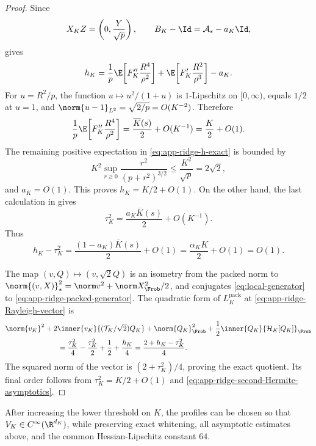 \begin{proof}
Since
\[
  X_KZ=\left(0,\frac{Y}{\sqrt p}\right),\qquad
  B_K-\Id=\mathcal A_s-a_K\Id,
\]
 gives
\begin{equation}
  h_K
  =
  \frac1p\E\!\left[
    F_K''\frac{R^4}{\rho^2}
  \right]
  +
  \E\!\left[
    F_K'\frac{R^2}{\rho^3}
  \right]
  -a_K.
  \label{eq:app-ridge-h-exact}
\end{equation}
For \(u=R^2/p\), the function \(u\mapsto u^2/(1+u)\) is
\(1\)-Lipschitz on \([0,\infty)\), equals \(1/2\) at \(u=1\), and
\(\norm{u-1}_{L^2}=\sqrt{2/p}=O(K^{-2})\).  Therefore
\[
  \frac1p\E\!\left[F_K''\frac{R^4}{\rho^2}\right]
  =
  \frac{\overline K(s)}2+O(K^{-1})
  =
  \frac K2+O(1).
\]
The remaining positive expectation in \eqref{eq:app-ridge-h-exact} is
bounded by
\[
  K^2\sup_{r\geq0}\frac{r^2}{(p+r^2)^{3/2}}
  \leq\frac{K^2}{\sqrt p}=2\sqrt2,
\]
and \(a_K=O(1)\).  This proves \(h_K=K/2+O(1)\).
On the other hand, the last calculation in
 gives
\[
  \tau_K^2
  =
  \frac{a_K\overline K(s)}2+O(K^{-1}).
\]
Thus
\[
  h_K-\tau_K^2
  =
  \frac{(1-a_K)\overline K(s)}2+O(1)
  =
  \frac{\alpha_KK}{2}+O(1)
  =
  O(1).
\]

The map
\((v,Q)\mapsto(v,\sqrt2Q)\) is an isometry from the packed norm to
\(\norm{(v,X)}_\star^2=\norm v^2+\norm X_{\Frob}^2/2\), and conjugates
\eqref{eq:local-generator} to
\eqref{eq:app-ridge-packed-generator}.  The quadratic form of
\(L_K^{\mathrm{pack}}\) at
\eqref{eq:app-ridge-Rayleigh-vector} is
\begin{align*}
  &\norm{v_K}^2
  +2\inner{v_K}{(\mathcal T_K/\sqrt2)Q_K}
  +\norm{Q_K}_{\Frob}^2
  +\frac12\inner{Q_K}{\mathcal H_K[Q_K]}_{\Frob}\\
  &\hspace{25mm}
  =
  \frac{\tau_K^2}{4}-\frac{\tau_K^2}{2}
  +\frac12+\frac{h_K}{4}
  =
  \frac{2+h_K-\tau_K^2}{4}.
\end{align*}
The squared norm of the vector is
\((2+\tau_K^2)/4\), proving the exact quotient.  Its final order follows
from \(\tau_K^2=K/2+O(1)\) and
\eqref{eq:app-ridge-second-Hermite-asymptotics}.
\end{proof}

\begin{lemma}
\label{lem:app-ridge-mollification}
After increasing the lower threshold on \(K\), the profiles can be chosen
so that \(V_K\in C^\infty(\R^{d_K})\), while preserving exact whitening,
all asymptotic estimates above, and the common Hessian-Lipschitz constant
\(64\).
\end{lemma}


